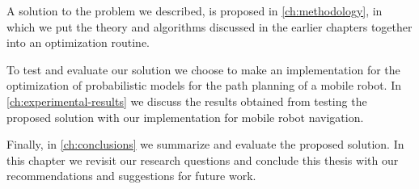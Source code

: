 A solution to the problem we described, is proposed in \autoref{ch:methodology}, in which we put the theory and algorithms discussed in the earlier chapters together into an optimization routine.

To test and evaluate our solution we choose to make an implementation for the optimization of probabilistic models for the path planning of a mobile robot.
In \autoref{ch:experimental-results} we discuss the results obtained from testing the proposed solution with our implementation for mobile robot navigation.

Finally, in \autoref{ch:conclusions} we summarize and evaluate the proposed solution. In this chapter we revisit our research questions and conclude this thesis with our recommendations and suggestions for future work.

%
